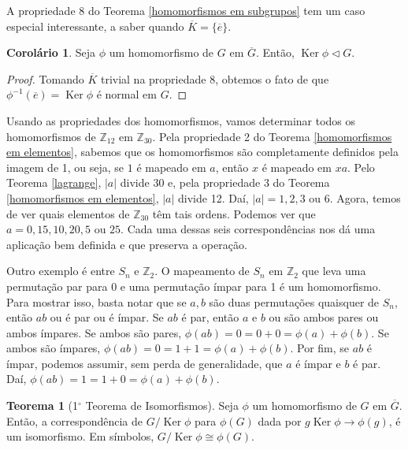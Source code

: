 \documentclass[a4paper,portuguese,11pt,twoside, leqno]{book}
\DeclareMathOperator{\Ker}{Ker}
\theoremstyle{definition}
\newtheorem{theorem}{Teorema}[section]
\newtheorem{corollary}{Corolário}[theorem]
\begin{document}
	\par\vspace{0.3cm} A propriedade 8 do Teorema \eqref{homomorfismos em subgrupos} tem um caso especial interessante, a saber quando $\overline{K} = \{\overline{e}\}$.
	
	\begin{corollary}
		\label{nucleo normal}
		Seja $\phi$ um homomorfismo de $G$ em $\overline{G}$. Então, $\Ker\phi\vartriangleleft G$. 
	\end{corollary}
	
	\begin{proof}
		Tomando $\overline{K}$ trivial na propriedade 8, obtemos o fato de que $\phi^{-1}(\overline{e}) = \Ker\phi$ é normal em $G$.
	\end{proof}
	\par\vspace{0.3cm} Usando as propriedades dos homomorfismos, vamos determinar todos os homomorfismos de $\mathbb{Z}_{12}$ em $\mathbb{Z}_{30}$. Pela propriedade 2 do Teorema \eqref{homomorfismos em elementos}, sabemos que os homomorfismos são completamente definidos pela imagem de 1, ou seja, se $1$ é mapeado em $a$, então $x$ é mapeado em $xa$. Pelo Teorema \eqref{lagrange}, $|a|$ divide 30 e, pela propriedade 3 do Teorema \eqref{homomorfismos em elementos}, $|a|$ divide 12. Daí, $|a| = 1, 2, 3 \text{ ou } 6$. Agora, temos de ver quais elementos de $\mathbb{Z}_{30}$ têm tais ordens. Podemos ver que $a = 0, 15, 10, 20, 5 \text{ ou } 25$. Cada uma dessas seis correspondências nos dá uma aplicação bem definida e que preserva a operação.
	\par\vspace{0.3cm} Outro exemplo é entre $S_n$ e $\mathbb{Z}_2$.	O mapeamento de $S_n$ em $\mathbb{Z}_2$ que leva uma permutação par para 0 e uma permutação ímpar para 1 é um homomorfismo. Para mostrar isso, basta notar que se $a,b$ são duas permutações quaisquer de $S_n$, então $ab$ ou é par ou é ímpar. Se $ab$ é par, então $a$ e $b$ ou são ambos pares ou ambos ímpares. Se ambos são pares, $\phi(ab) = 0 = 0 + 0 = \phi(a) + \phi(b)$. Se ambos são ímpares, $\phi(ab) = 0 = 1 + 1 = \phi(a) + \phi(b)$. Por fim, se $ab$ é ímpar, podemos assumir, sem perda de generalidade, que $a$ é ímpar e $b$ é par. Daí, $\phi(ab) = 1 = 1 + 0 = \phi(a) + \phi(b)$.
	
	\begin{theorem}[1$^\circ$ Teorema de Isomorfismos]
		\label{primeiro teorema de isomorfismo}
		Seja $\phi$ um homomorfismo de $G$ em $\overline{G}$. Então, a correspondência de $G/\Ker\phi$ para $\phi(G)$ dada por $g\Ker\phi \to \phi(g)$, é um isomorfismo. Em símbolos, $G/\Ker\phi\cong\phi(G)$.
	\end{theorem}
	
\end{document}
